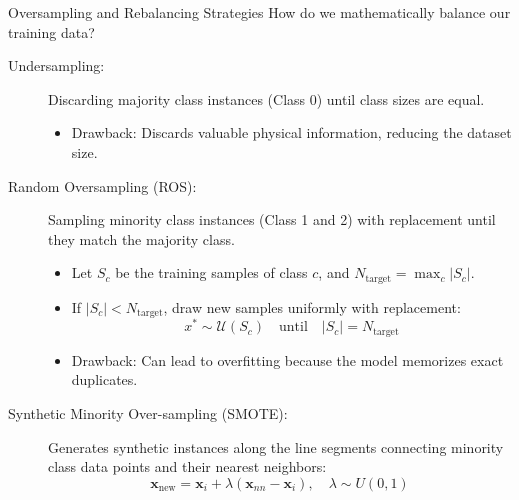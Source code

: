 \documentclass[9pt]{beamer}
\begin{document}
\begin{frame}{Oversampling and Rebalancing Strategies}
  How do we mathematically balance our training data?
  \begin{description}
    \item[Undersampling:] Discarding majority class instances (Class 0) until class sizes are equal.
      \begin{itemize}
        \item \alert{Drawback:} Discards valuable physical information, reducing the dataset size.
      \end{itemize}
    \item[Random Oversampling (ROS):] Sampling minority class instances (Class 1 and 2) with replacement until they match the majority class.
      \begin{itemize}
        \item Let $S_c$ be the training samples of class $c$, and $N_{\text{target}} = \max_c |S_c|$.
        \item If $|S_c| < N_{\text{target}}$, draw new samples uniformly with replacement:
          $$x^* \sim \mathcal{U}(S_c) \quad \text{until} \quad |S_c| = N_{\text{target}}$$
        \item \alert{Drawback:} Can lead to overfitting because the model memorizes exact duplicates.
      \end{itemize}
    \item[Synthetic Minority Over-sampling (SMOTE):]
      Generates synthetic instances along the line segments connecting minority class data points and their nearest neighbors:
      $$\mathbf{x}_{\text{new}} = \mathbf{x}_i + \lambda (\mathbf{x}_{nn} - \mathbf{x}_i), \quad \lambda \sim U(0, 1)$$
  \end{description}
\end{frame}
\end{document}
